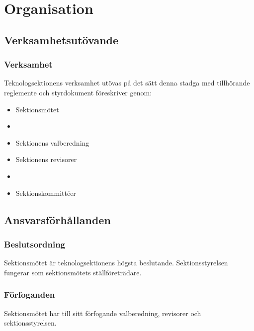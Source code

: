 \section{Organisation}

\subsection{Verksamhetsutövande}

\subsubsection{Verksamhet}

Teknologsektionens verksamhet utövas på det sätt denna stadga med tillhörande reglemente och styrdokument föreskriver genom:

\begin{itemize}
	\item Sektionsmötet
	\item \STYRITFULL
	\item Sektionens valberedning
	\item Sektionens revisorer
	\item \SNITFULL
	\item Sektionskommittéer
\end{itemize}

\subsection{Ansvarsförhållanden}

\subsubsection{Beslutsordning}
Sektionsmötet är teknologsektionens högsta beslutande. Sektionsstyrelsen fungerar som sektionsmötets ställföreträdare.

\subsubsection{Förfoganden}
Sektionsmötet har till sitt förfogande valberedning, revisorer och sektionsstyrelsen.

